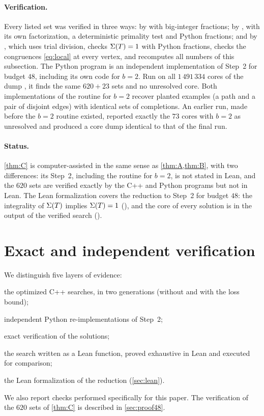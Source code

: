 \documentclass[11pt]{article}
\begin{document}
\paragraph{Verification.}
Every listed set was verified in three ways: by  with big-integer fractions; by , with its own factorization, a deterministic primality test and Python fractions; and by , which uses trial division, checks $\Sigma(T)=1$ with Python fractions, checks the congruences \eqref{eq:local} at every vertex, and recomputes all numbers of this subsection.
The Python program  is an independent implementation of Step~2 for budget $48$, including its own code for $b=2$. Run on all $1\,491\,334$ cores of the dump , it finds the same $620+23$ sets and no unresolved core.
Both implementations of the routine for $b=2$ recover planted examples (a path and a pair of disjoint edges) with identical sets of completions.
An earlier run, made before the $b=2$ routine existed, reported exactly the $73$ cores with $b=2$ as unresolved and produced a core dump identical to that of the final run.

\paragraph{Status.}
\cref{thm:C} is computer-assisted in the same sense as \cref{thm:A,thm:B}, with two differences: its Step~2, including the routine for $b=2$, is not stated in Lean, and the $620$ sets are verified exactly by the C++ and Python programs but not in Lean. The Lean formalization covers the reduction to Step~2 for budget $48$: the integrality of $\Sigma(T)$ implies $\Sigma(T)=1$ (), and the core of every solution is in the output of the verified search ().

\section{Exact and independent verification}\label{sec:verification}

We distinguish five layers of evidence:
\begin{enumerate*}[label=(\arabic*)]
\item the optimized C++ searches, in two generations (without and with the loss bound);
\item independent Python re-implementations of Step~2;
\item exact verification of the solutions;
\item the search written as a Lean function, proved exhaustive in Lean and executed for comparison;
\item the Lean formalization of the reduction (\cref{sec:lean}).
\end{enumerate*}
We also report checks performed specifically for this paper. The verification of the $620$ sets of \cref{thm:C} is described in \cref{sec:proof48}.
\end{document}
